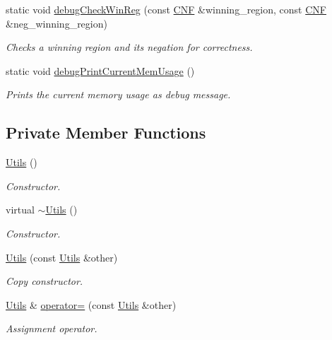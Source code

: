 \begin{DoxyCompactItemize}
static void \hyperlink{classUtils_a448f5356530d2e88fa9928f4ed857238}{debug\-Check\-Win\-Reg} (const \hyperlink{classCNF}{C\-N\-F} \&winning\-\_\-region, const \hyperlink{classCNF}{C\-N\-F} \&neg\-\_\-winning\-\_\-region)
\begin{DoxyCompactList}\small\item\em Checks a winning region and its negation for correctness. \end{DoxyCompactList}\item 
static void \hyperlink{classUtils_af69b7f70358d1c1616aab1560c7363cd}{debug\-Print\-Current\-Mem\-Usage} ()
\begin{DoxyCompactList}\small\item\em Prints the current memory usage as debug message. \end{DoxyCompactList}\end{DoxyCompactItemize}
\subsection*{Private Member Functions}
\begin{DoxyCompactItemize}
\item 
\hyperlink{classUtils_a452e78692c87ed5c7c993b6c6ac4981a}{Utils} ()
\begin{DoxyCompactList}\small\item\em Constructor. \end{DoxyCompactList}\item 
virtual \hyperlink{classUtils_a0d842a927296003dd7088fc1e4e2a367}{$\sim$\-Utils} ()
\begin{DoxyCompactList}\small\item\em Constructor. \end{DoxyCompactList}\item 
\hyperlink{classUtils_a80726f8ec2ed2707a8bfd4fd355ef27a}{Utils} (const \hyperlink{classUtils}{Utils} \&other)
\begin{DoxyCompactList}\small\item\em Copy constructor. \end{DoxyCompactList}\item 
\hyperlink{classUtils}{Utils} \& \hyperlink{classUtils_a0ed61b802f94ec15000c458e9aae4f19}{operator=} (const \hyperlink{classUtils}{Utils} \&other)
\begin{DoxyCompactList}\small\item\em Assignment operator. \end{DoxyCompactList}\end{DoxyCompactItemize}


